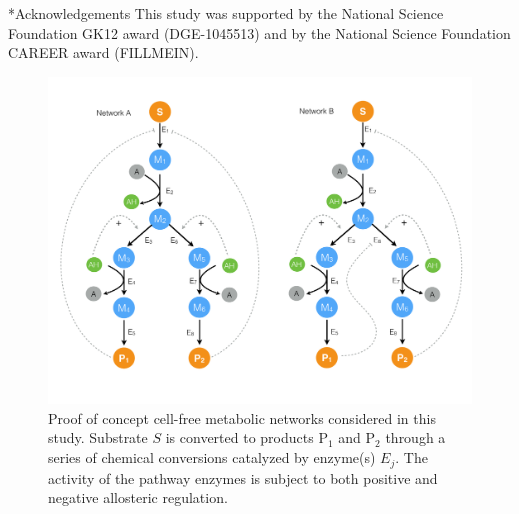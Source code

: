\documentclass[12pt]{article}
\makeatletter
\renewcommand\section{\@startsection
	{subsection}{2}{0mm}
	{-0.2in}
	{0.05\baselineskip}
	{\normalfont\large\bfseries}}
\makeatother
\begin{document}
\section*{Acknowledgements}
This study was supported by the National Science Foundation GK12 award (DGE-1045513) 
and by the National Science Foundation CAREER award (FILLMEIN).

\clearpage
%
%




\clearpage

\begin{figure}
\centering
\includegraphics[width=1.0\textwidth]{./figs/Figure-1-Networks.pdf}
\caption{Proof of concept cell-free metabolic networks considered in this study. Substrate $S$ is converted to products P$_{1}$ and P$_{2}$ through a series of chemical conversions
catalyzed by enzyme(s) $E_{j}$. The activity of the pathway enzymes is subject to both positive and negative allosteric regulation. }\label{fig-networks}
\end{figure}

\clearpage
\end{document}
